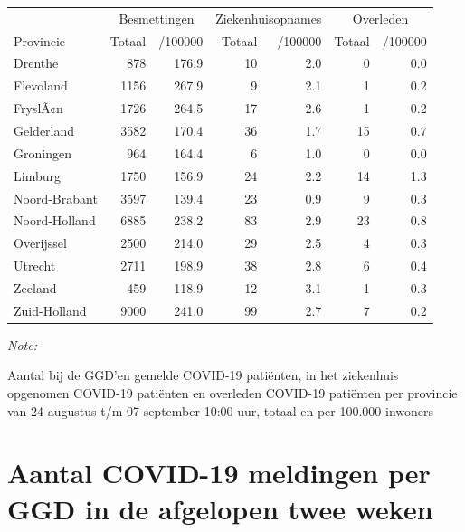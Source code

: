 \documentclass[
  english,
  man,floatsintext]{apa6}
\begin{document}
\begin{table}
\centering
\begin{threeparttable}
\begin{tabular}{lrrrrrr}
\toprule
\multicolumn{1}{c}{ } & \multicolumn{2}{c}{Besmettingen} & \multicolumn{2}{c}{Ziekenhuisopnames} & \multicolumn{2}{c}{Overleden} \\
\cmidrule(l{3pt}r{3pt}){2-3} \cmidrule(l{3pt}r{3pt}){4-5} \cmidrule(l{3pt}r{3pt}){6-7}
Provincie & Totaal & /100000 & Totaal & /100000 & Totaal & /100000\\
\midrule
Drenthe & 878 & 176.9 & 10 & 2.0 & 0 & 0.0\\
Flevoland & 1156 & 267.9 & 9 & 2.1 & 1 & 0.2\\
FryslÃ¢n & 1726 & 264.5 & 17 & 2.6 & 1 & 0.2\\
Gelderland & 3582 & 170.4 & 36 & 1.7 & 15 & 0.7\\
Groningen & 964 & 164.4 & 6 & 1.0 & 0 & 0.0\\
Limburg & 1750 & 156.9 & 24 & 2.2 & 14 & 1.3\\
Noord-Brabant & 3597 & 139.4 & 23 & 0.9 & 9 & 0.3\\
Noord-Holland & 6885 & 238.2 & 83 & 2.9 & 23 & 0.8\\
Overijssel & 2500 & 214.0 & 29 & 2.5 & 4 & 0.3\\
Utrecht & 2711 & 198.9 & 38 & 2.8 & 6 & 0.4\\
Zeeland & 459 & 118.9 & 12 & 3.1 & 1 & 0.3\\
Zuid-Holland & 9000 & 241.0 & 99 & 2.7 & 7 & 0.2\\
\bottomrule
\end{tabular}
\begin{tablenotes}
\item \textit{Note: } 
\item Aantal bij de GGD’en gemelde COVID-19 patiënten, in het ziekenhuis opgenomen COVID-19 patiënten en overleden COVID-19 patiënten per provincie van 24 augustus t/m 07 september 10:00 uur, totaal en per 100.000 inwoners
\end{tablenotes}
\end{threeparttable}
\end{table}

\newpage

\hypertarget{aantal-covid-19-meldingen-per-ggd-in-de-afgelopen-twee-weken}{%
\section{Aantal COVID-19 meldingen per GGD in de afgelopen twee weken}\label{aantal-covid-19-meldingen-per-ggd-in-de-afgelopen-twee-weken}}
\end{document}
